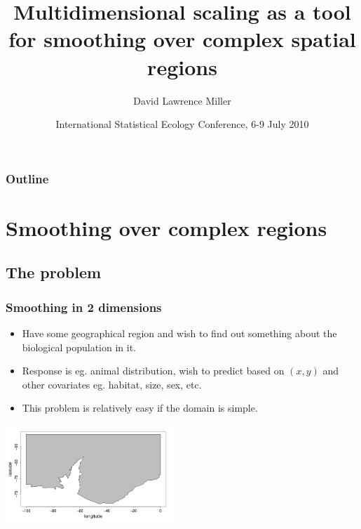 \documentclass[ignorenonframetext]{beamer} %
\title[Smoothing over complex regions]{Multidimensional scaling as a tool for smoothing over complex spatial regions}
\author[Miller]{David Lawrence Miller}
\institute{Mathematical Sciences\\University of Bath}
\date[July 2010] {International Statistical Ecology Conference, 6-9 July 2010}
\newcommand{\bc}{\begin{center}}
\newcommand{\ec}{\end{center}}
\newcommand{\bi}{\begin{itemize}}
\newcommand{\ei}{\end{itemize}}
\begin{document}
\begin{frame}
  \titlepage
\end{frame}


 {
\begin{frame}
  \frametitle{Outline}
  \tableofcontents %
\end{frame}
}

\section{Smoothing over complex regions}

\subsection{The problem}

\begin{frame}
	\frametitle{Smoothing in 2 dimensions}
       \bi
         \item Have some geographical region and wish to find out something about the biological population in it. 
         \item Response is eg. animal distribution, wish to predict based on $(x,y)$ and other covariates eg. habitat, size, sex, etc.
         \item This problem is relatively easy if the domain is simple.
       \ei
       \bc
         \includegraphics[width=2.5in]{figs/peninsula.png}
       \ec
\end{frame}
\end{document}
